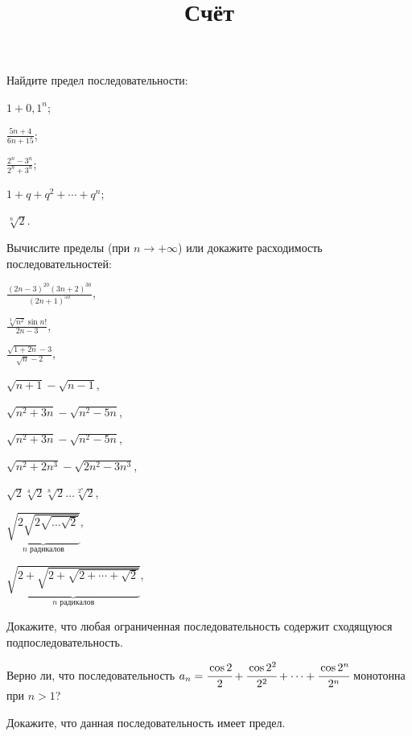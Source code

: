 \documentclass[a4paper, 12pt, num=31]{listok}
\begin{document}
\title{Счёт}
\maketitle{}
\begin{problem}
    Найдите предел последовательности:
    \begin{probparts}
        \item $1 + {0{,}1}^n$;
        \item $\frac{5n + 4}{6n + 15}$;
        \item $\frac{2^n - 3^n}{2^n + 3^n}$;
        \item $1 + q + q^2 + \cdots + q^n$;
        \item $\sqrt[n]{2}$.
    \end{probparts}
\end{problem}
\begin{problem}
    Вычислите пределы (при $n \to + \infty$) или докажите расходимость последовательностей:
    \begin{probparts}
        \item $\frac{{(2n - 3)}^{20} {(3n + 2)}^{30}}{{(2n + 1)}^{50}}$,
        \item $\frac{\sqrt[3]{n^2}\sin{n!}}{2n - 3}$,
        \item $\frac{\sqrt{1 + 2n} - 3}{\sqrt n - 2}$,
        \item $\sqrt{n + 1} - \sqrt{n - 1}$,
        \item $\sqrt{n^2 + 3n} - \sqrt{n^2 - 5n}$,
        \item $\sqrt{n^2 + 3n} - \sqrt{n^2 - 5n}$,
        \item $\sqrt{n^2 + 2n^3} - \sqrt{2n^2 - 3n^3}$,
        \item $\sqrt2\sqrt[4]2\sqrt[8]2\dots\sqrt[2^n]2$,
        \item $\underbrace{\sqrt{2\sqrt{2\sqrt{\dots\sqrt 2}}}}_{\text{$n$ радикалов}}$,
        \item $\underbrace{\sqrt{2 + \sqrt{2 + \sqrt{2 + \cdots + \sqrt 2}}}}_{\text{$n$ радикалов}}$,
    \end{probparts}
\end{problem}
\begin{problem}[(у)]
    Докажите, что любая ограниченная последовательность содержит сходящуюся подпоследовательность.
\end{problem}
\begin{problem}
\begin{probparts}
    \item Верно ли, что последовательность $a_n = \cfrac{\cos2}2 + \cfrac{\cos 2^2}{2^2} + \cdots + \cfrac{\cos 2^n}{2^n}$ монотонна при $n > 1$?
    \item Докажите, что данная последовательность имеет предел.
\end{probparts}
\end{problem}
\end{document}

